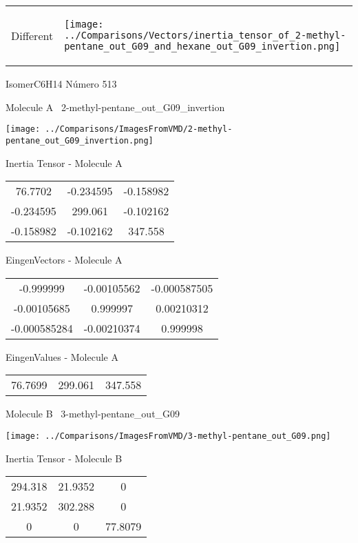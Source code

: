 \vtab[-5mm]
\begin{tabular}{*{2}{m{}}}
\begin{center}
\textcolor{NavyBlue}{\Large Different}
\end{center}
&
\begin{center}
\texttt{[image: ../Comparisons/Vectors/inertia\_tensor\_of\_2-methyl-pentane\_out\_G09\_and\_hexane\_out\_G09\_invertion.png]}
\end{center}
\end{tabular}

 \newpage

\vtab[-3cm]
\begin{center}
{\large IsomerC6H14 \tab Número 513}
\end{center}
\begin{multicols}{2}
\begin{center}

Molecule A \
2-methyl-pentane\_out\_G09\_invertion

\texttt{[image: ../Comparisons/ImagesFromVMD/2-methyl-pentane\_out\_G09\_invertion.png]}

Inertia Tensor - Molecule A \\
\begin{tabular}{|c c c|}
76.7702	 & 	-0.234595	 & 	-0.158982	 \\
-0.234595	 & 	299.061	 & 	-0.102162	 \\
-0.158982	 & 	-0.102162	 & 	347.558
\end{tabular}

\vtab
 EingenVectors - Molecule A     \\
\begin{tabular}{|c c c|}
-0.999999	 & 	-0.00105562	 & 	-0.000587505	 \\
-0.00105685	 & 	0.999997	 & 	0.00210312	 \\
-0.000585284	 & 	-0.00210374	 & 	0.999998
\end{tabular}

\vtab
 EingenValues - Molecule A     \\
\begin{tabular}{|c c c|}
76.7699	 & 	299.061	 & 	347.558	 \\
\end{tabular}
\columnbreak

Molecule B \
3-methyl-pentane\_out\_G09

\texttt{[image: ../Comparisons/ImagesFromVMD/3-methyl-pentane\_out\_G09.png]}

Inertia Tensor - Molecule B \\
\begin{tabular}{|c c c|}
294.318	 & 	21.9352	 & 	0	 \\
21.9352	 & 	302.288	 & 	0	 \\
0	 & 	0	 & 	77.8079
\end{tabular}


\end{center}
\end{multicols}
